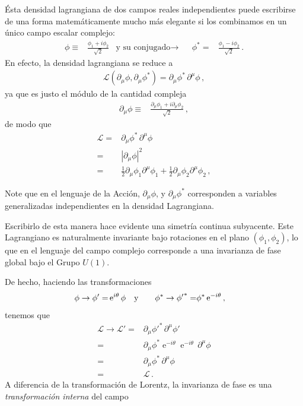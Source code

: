 \begin{frame}
Ésta densidad lagrangiana de dos campos reales independientes puede escribirse de una forma matemáticamente mucho más elegante si los combinamos en un único campo escalar complejo:
\begin{align}
  \phi\equiv&\frac{\phi_1+i\phi_2}{\sqrt{2}} &\text{y su conjugado}\to&&   \phi^{*}=&\frac{\phi_1-i\phi_2}{\sqrt{2}}\,.
\end{align}
En efecto, la densidad lagrangiana se reduce a
\begin{align}
  \label{eq:kincmplx}
  \mathcal{L}(\partial_{\mu} \phi,\partial_{\mu} \phi^{*})=  {\partial_\mu\phi^{*}}\,{\partial^\mu\phi}\,,
\end{align}
ya que es justo el módulo de la cantidad compleja
\begin{align*}
   \partial_\mu\phi\equiv&\frac{\partial_\mu\phi_1+i\partial_\mu\phi_2}{\sqrt{2}}\,,
\end{align*}
de modo que 
\begin{align*}
  \mathcal{L}=&  {\partial_\mu\phi^{*}}\,{\partial^\mu\phi}\\
  =&\left| \partial_\mu\phi  \right|^2 \\
  = & \frac{1}{2}\partial_{\mu}\phi_1 \partial^{\mu}\phi_1+\frac{1}{2}\partial_{\mu}\phi_2 \partial^{\mu}\phi_2\,,
\end{align*}


Note que en el lenguaje de la Acción, $\partial_{\mu} \phi$, y $\partial_{\mu} \phi^{*}$ corresponden a  variables generalizadas independientes en la densidad Lagrangiana.


Escribirlo de esta manera hace evidente una simetría continua subyacente. Este Lagrangiano es naturalmente invariante bajo rotaciones en el plano $(\phi_1,\phi_2)$, lo que en el lenguaje del campo complejo corresponde a una invarianza de fase global bajo el Grupo $U(1)$.

De hecho, haciendo las transformaciones
\begin{align}
  \phi \to \phi' =& \operatorname{e}^{i\theta}\phi &\text{y\qquad}
  \phi^* \to {\phi'}^* =&\phi^* \operatorname{e}^{-i\theta}\,,
\end{align}
tenemos que
\begin{align}
  \mathcal{L} \to  \mathcal{L}' =&  {\partial_\mu{\phi'}^{*}}\,{\partial^\mu\phi'}\nonumber\\
  =&  {\partial_\mu{\phi}^{*}}\operatorname{e}^{-i\theta}\operatorname{e}^{-i\theta}\,{\partial^\mu\phi}\nonumber\\
 =& {\partial_\mu{\phi}^{*}}\,{\partial^\mu\phi}\nonumber\\
 =& \mathcal{L}\,. 
\end{align}
A diferencia de la transformación de Lorentz, la invarianza de fase es una \emph{transformación interna} del campo
\end{frame}


